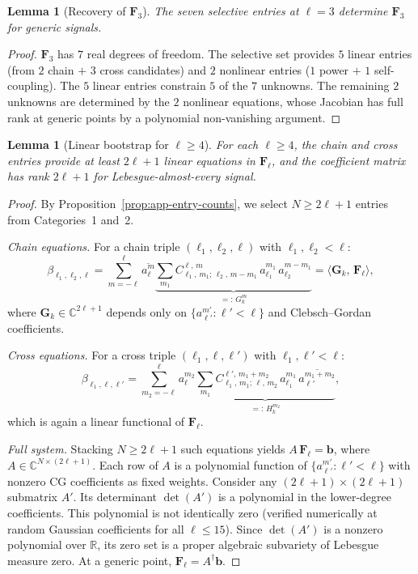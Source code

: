\documentclass{article}
\newtheorem{lemma}[theorem]{Lemma}
\newcommand{\R}{\mathbb{R}}
\newcommand{\C}{\mathbb{C}}
\newcommand{\CG}[6]{C^{#5,\,#6}_{#1,\,#2;\,#3,\,#4}}
\newcommand{\conj}[1]{\overline{#1}}
\newcommand{\ip}[2]{\langle #1,\, #2 \rangle}
\begin{document}
\begin{lemma}[Recovery of $\mathbf{F}_3$]\label{lem:app-F3}
The seven selective entries at $\ell = 3$ determine $\mathbf{F}_3$
for generic signals.
\end{lemma}
\begin{proof}
$\mathbf{F}_3$ has $7$ real degrees of freedom. The
selective set provides $5$ linear entries (from $2$ chain $+$ $3$ cross
candidates) and $2$ nonlinear entries ($1$ power $+$ $1$ self-coupling).
The $5$ linear entries constrain $5$ of the $7$ unknowns. The remaining
$2$ unknowns are determined by the $2$ nonlinear equations, whose
Jacobian has full rank at generic points by a polynomial
non-vanishing argument.
\end{proof}

\begin{lemma}[Linear bootstrap for $\ell \ge 4$]
\label{lem:app-linear-bootstrap}
For each $\ell \ge 4$, the chain and cross entries provide at least
$2\ell + 1$ linear equations in $\mathbf{F}_\ell$, and the coefficient
matrix has rank $2\ell+1$ for Lebesgue-almost-every signal.
\end{lemma}
\begin{proof}
By Proposition~\ref{prop:app-entry-counts}, we select $N \ge 2\ell+1$
entries from Categories~1 and~2.

\medskip\noindent
\textit{Chain equations.}
For a chain triple $(\ell_1, \ell_2, \ell)$ with $\ell_1, \ell_2 < \ell$:
\[
  \beta_{\ell_1,\ell_2,\ell}
  = \sum_{m=-\ell}^{\ell} \conj{a_\ell^m}
    \underbrace{
      \sum_{m_1} \CG{\ell_1}{m_1}{\ell_2}{m-m_1}{\ell}{m}\,
      a_{\ell_1}^{m_1}\,a_{\ell_2}^{m-m_1}
    }_{=:\, G_k^m}
  = \ip{\mathbf{G}_k}{\mathbf{F}_\ell},
\]
where $\mathbf{G}_k \in \C^{2\ell+1}$ depends only on
$\{a_{\ell'}^{m'} : \ell' < \ell\}$ and Clebsch--Gordan coefficients.

\medskip\noindent
\textit{Cross equations.}
For a cross triple $(\ell_1, \ell, \ell')$ with $\ell_1, \ell' < \ell$:
\[
  \beta_{\ell_1,\ell,\ell'}
  = \sum_{m_2=-\ell}^{\ell} a_\ell^{m_2}
    \underbrace{
      \sum_{m_1} \CG{\ell_1}{m_1}{\ell}{m_2}{\ell'}{m_1+m_2}\,
      a_{\ell_1}^{m_1}\,\conj{a_{\ell'}^{m_1+m_2}}
    }_{=:\, H_k^{m_2}},
\]
which is again a linear functional of $\mathbf{F}_\ell$.

\medskip\noindent
\textit{Full system.}
Stacking $N \ge 2\ell+1$ such equations yields
$A\,\mathbf{F}_\ell = \mathbf{b}$,
where $A \in \C^{N \times (2\ell+1)}$. Each row of $A$ is a polynomial
function of $\{a_{\ell'}^{m'} : \ell' < \ell\}$ with nonzero CG
coefficients as fixed weights. Consider any $(2\ell+1) \times (2\ell+1)$
submatrix $A'$. Its determinant $\det(A')$ is a polynomial in the
lower-degree coefficients. This polynomial is not identically zero
(verified numerically at random Gaussian coefficients for all
$\ell \le 15$). Since $\det(A')$ is a nonzero polynomial over $\R$,
its zero set is a proper algebraic subvariety of Lebesgue measure zero.
At a generic point, $\mathbf{F}_\ell = A^\dagger \mathbf{b}$.
\end{proof}
\end{document}
